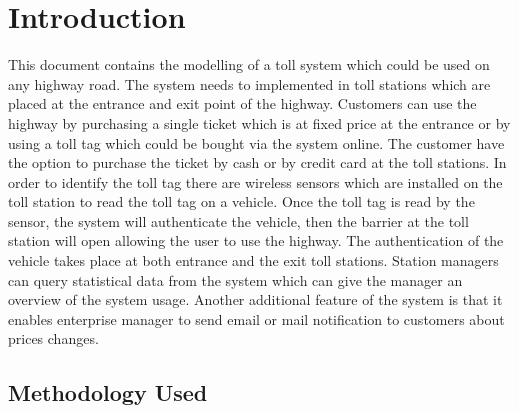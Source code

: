 \chapter{Introduction}
\noindent
This document contains the modelling of a toll system which could be used on any highway road. The system needs to implemented in toll stations which are placed at the entrance and exit point of the highway. Customers can use the highway by purchasing a single ticket which is at fixed price at the entrance or by using a toll tag which could be bought via the system online. The customer have the option to purchase the ticket by cash or by credit card at the toll stations. In order to identify the toll tag there are wireless sensors which are installed on the toll station to read the toll tag on a vehicle. Once the toll tag is read by the sensor, the system will authenticate the vehicle, then the barrier at the toll station will open allowing the user to use the highway. The authentication of the vehicle takes place at both entrance and the exit toll stations. Station managers can query statistical data from the system which can give the manager an overview of the system usage. Another additional feature of the system is that it enables enterprise manager to send email or mail notification to customers about prices changes.
\section{Methodology Used}